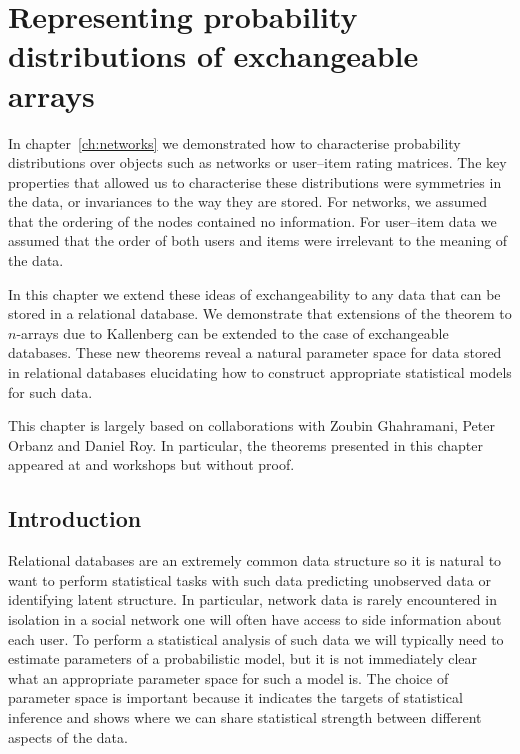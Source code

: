 
\inbpdocument

\chapter{Representing probability distributions of exchangeable arrays}
\label{ch:arrays}

In chapter~\ref{ch:networks} we demonstrated how to characterise probability distributions over objects such as networks or user--item rating matrices.
The key properties that allowed us to characterise these distributions were symmetries in the data, or invariances to the way they are stored.
For networks, we assumed that the ordering of the nodes contained no information.
For user--item data we assumed that the order of both users and items were irrelevant to the meaning of the data.

In this chapter we extend these ideas of exchangeability to any data that can be stored in a relational database.
We demonstrate that extensions of the  theorem to $n$-arrays due to Kallenberg  can be extended to the case of exchangeable databases.
These new theorems reveal a natural parameter space for data stored in relational databases elucidating how to construct appropriate statistical models for such data.

This chapter is largely based on collaborations with Zoubin Ghahramani, Peter Orbanz and Daniel Roy.
In particular, the theorems presented in this chapter appeared at  and  workshops but without proof.

\section{Introduction}

Relational databases are an extremely common data structure so it is natural to want to perform statistical tasks with such data \eg predicting unobserved data or identifying latent structure.
In particular, network data is rarely encountered in isolation \eg in a social network one will often have access to side information about each user.
To perform a statistical analysis of such data we will typically need to estimate parameters of a probabilistic model, but it is not immediately clear what an appropriate parameter space for such a model is.
The choice of parameter space is important because it indicates the targets of statistical inference and shows where we can share statistical strength between different aspects of the data.

